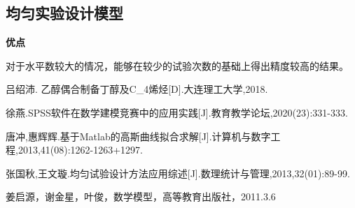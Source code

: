 \documentclass[withoutpreface,bwprint]{cumcmthesis} %
\begin{document}
\subsection{均匀实验设计模型}
\textbf{优点}

对于水平数较大的情况，能够在较少的试验次数的基础上得出精度较高的结果。

\newpage
\begin{thebibliography}{9}%
	 吕绍沛. 乙醇偶合制备丁醇及C\_4烯烃[D].大连理工大学,2018.
	
	徐燕.SPSS软件在数学建模竞赛中的应用实践[J].教育教学论坛,2020(23):331-333.
	
	 唐冲,惠辉辉.基于Matlab的高斯曲线拟合求解[J].计算机与数字工程,2013,41(08):1262-1263+1297.
	
	 张国秋,王文璇.均匀试验设计方法应用综述[J].数理统计与管理,2013,32(01):89-99.
	
	 姜启源，谢金星，叶俊，数学模型，高等教育出版社，2011.3.6
\end{thebibliography}
\end{document}
